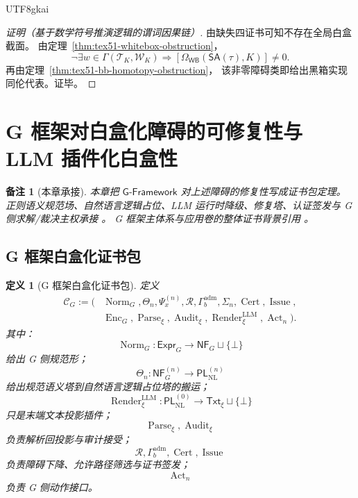 \documentclass[12pt]{article}
\newtheorem{definition}{定义}[section]
\newtheorem{remark}{备注}[section]
\newcommand{\GFramework}{\textsf{G-Framework}}
\newcommand{\WB}{\mathsf{WB}}
\newcommand{\SA}{\mathsf{SA}}
\newcommand{\Cert}{\operatorname{Cert}}
\newcommand{\Norm}{\operatorname{Norm}}
\newcommand{\Render}{\operatorname{Render}}
\newcommand{\Parse}{\operatorname{Parse}}
\newcommand{\Audit}{\operatorname{Audit}}
\newcommand{\Issue}{\operatorname{Issue}}
\newcommand{\Enc}{\operatorname{Enc}}
\newcommand{\Act}{\operatorname{Act}}
\begin{document}
\begin{CJK*}{UTF8}{gkai}
\begin{proof}[证明（基于数学符号推演逻辑的谓词因果链）]
由缺失四证书可知不存在全局白盒截面。
由定理~\ref{thm:tex51-whitebox-obstruction}，
\[
  \neg\exists w\in\Gamma(\mathcal T_K,\mathcal W_K)
  \Rightarrow
  [\Omega_{\WB}(\SA(\tau),K)]\ne0.
\]
再由定理~\ref{thm:tex51-bb-homotopy-obstruction}，
该非零障碍类即给出黑箱实现同伦代表。证毕。
\end{proof}

\clearpage

\section{G 框架对白盒化障碍的可修复性与 LLM 插件化白盒性}
\label{sec:tex51-gframework-whitebox-repair}

\begin{remark}[本章承接]
本章把 \(\GFramework\) 对上述障碍的修复性写成证书包定理。
正则语义规范场、自然语言逻辑占位、LLM 运行时降级、修复塔、认证签发与 G 侧求解/裁决主权承接
\cite{RepoTex37SemanticRuntime,RepoTex21AuditedWrapper}。
G 框架主体系与应用卷的整体证书背景引用
\cite{GaoZheng2025GFramework,GaoZhengAppVol1,GaoZhengAppVol2,GaoZhengAppVol3}。
\end{remark}

\subsection{G 框架白盒化证书包}
\label{subsec:tex51-g-certificate-package}

\begin{definition}[G 框架白盒化证书包]
定义
\[
\begin{aligned}
  \mathcal C_G
  :=
  (&\Norm_G,\Theta_n,\Psi_x^{(n)},\mathcal R,
  \Gamma_b^{\mathrm{adm}},\Sigma_n,\Cert,\Issue,\\
  &\Enc_G,\Parse_\xi,\Audit_\xi,\Render_\xi^{\mathrm{LLM}},\Act_n).
\end{aligned}
\]
其中：
\[
  \Norm_G:\mathsf{Expr}_G\to\mathsf{NF}_G\sqcup\{\bot\}
\]
给出 G 侧规范形；
\[
  \Theta_n:\mathsf{NF}_G^{(n)}\to\mathsf{PL}_{\mathrm{NL}}^{(n)}
\]
给出规范语义塔到自然语言逻辑占位塔的搬运；
\[
  \Render_\xi^{\mathrm{LLM}}:
  \mathsf{PL}_{\mathrm{NL}}^{(0)}
  \to
  \mathsf{Txt}_\xi\sqcup\{\bot\}
\]
只是末端文本投影插件；
\[
  \Parse_\xi,\Audit_\xi
\]
负责解析回投影与审计接受；
\[
  \mathcal R,\Gamma_b^{\mathrm{adm}},\Cert,\Issue
\]
负责障碍下降、允许路径筛选与证书签发；
\[
  \Act_n
\]
负责 G 侧动作接口。
\end{definition}


\end{CJK*}
\end{document}
